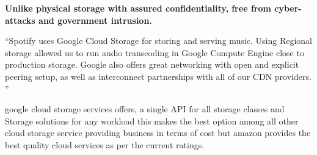 \documentclass[12pt]{article}
\begin{document}
	
	\cite{2}\textbf{Unlike physical storage with assured confidentiality, free from cyber-attacks and government intrusion.}
	
    \textquotedblleft{Spotify uses Google Cloud Storage for storing and serving music. Using Regional storage allowed us to run audio transcoding in Google Compute Engine close to production storage. Google also offers great networking with open and explicit peering setup, as well as interconnect partnerships with all of our CDN providers.}
   \textquotedblright
   
   \cite{3}google cloud storage services offers, a single API for all storage classes and Storage solutions for any workload this makes the best option among all other cloud storage service providing business in terms of cost but amazon provides the best quality cloud services as per the current ratings.
   
	
\newpage

	

	
	
\end{document}
